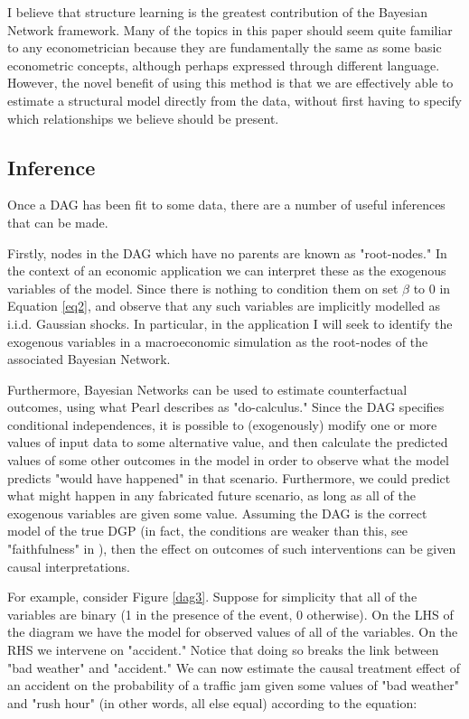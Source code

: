 \documentclass{article}
\begin{document}
I believe that structure learning is the greatest contribution of the Bayesian Network framework. Many of the topics in this paper should seem quite familiar to any econometrician because they are fundamentally the same as some basic econometric concepts, although perhaps expressed through different language. However, the novel benefit of using this method is that we are effectively able to estimate a structural model directly from the data, without first having to specify which relationships we believe should be present.

\subsection{Inference}
Once a DAG has been fit to some data, there are a number of useful inferences that can be made. 

Firstly, nodes in the DAG which have no parents are known as "root-nodes." In the context of an economic application we can interpret these as the exogenous variables of the model. Since there is nothing to condition them on set $\beta$ to 0 in Equation \ref{eq2}, and observe that any such variables are implicitly modelled as i.i.d. Gaussian shocks. In particular, in the application I will seek to identify the exogenous variables in a macroeconomic simulation as the root-nodes of the associated Bayesian Network.

Furthermore, Bayesian Networks can be used to estimate counterfactual outcomes, using what Pearl \cite{pearl2009causality} describes as "do-calculus." Since the DAG specifies conditional independences, it is possible to (exogenously) modify one or more values of input data to some alternative value, and then calculate the predicted values of some other outcomes in the model in order to observe what the model predicts "would have happened" in that scenario. Furthermore, we could predict what might happen in any fabricated future scenario, as long as all of the exogenous variables are given some value. Assuming the DAG is the correct model of the true DGP (in fact, the conditions are weaker than this, see "faithfulness" in \cite{pearl2009causality}), then the effect on outcomes of such interventions can be given causal interpretations. 

For example, consider Figure \ref{dag3}. Suppose for simplicity that all of the variables are binary (1 in the presence of the event, 0 otherwise). On the LHS of the diagram we have the model for observed values of all of the variables. On the RHS we intervene on "accident." Notice that doing so breaks the link between "bad weather" and "accident." We can now estimate the causal treatment effect of an accident on the probability of a traffic jam given some values of "bad weather" and "rush hour" (in other words, all else equal) according to the equation:
\end{document}
